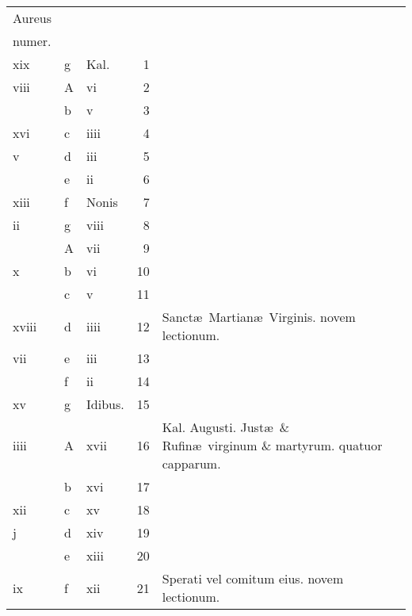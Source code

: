 \documentclass[11pt,openany]{book}
\begin{document}
\begin{center}
\begin{tabular}{l | l | l | r | l r}
\color{Red}Aureus & & & & \color{Red} \\
\color{Red}numer. & & & & \color{Red} \\
\color{Red} xix & g & \color{Red} Kal. & 1 & & \color{Red} \\
\color{Red} viii & \color{Red} A & \color{Red} vi & 2 & & \color{Red} \\
\color{Red}  & b & \color{Red} v & 3 & & \color{Red} \\
\color{Red} xvi & c & \color{Red} iiii & 4 & & \color{Red} \\
\color{Red} v & d & \color{Red} iii & 5 & & \color{Red} \\
\color{Red}  & e & \color{Red} ii & 6 & & \color{Red} \\
\color{Red} xiii & f & Nonis & 7 & & \color{Red} \\
\color{Red} ii & g & \color{Red} viii & 8 & & \color{Red} \\
\color{Red}  & \color{Red} A & \color{Red} vii & 9 & & \color{Red} \\
\color{Red} x & b & \color{Red} vi & 10 & & \color{Red} \\
\color{Red}  & c & \color{Red} v & 11 & & \color{Red} \\
\color{Red} xviii & d & \color{Red} iiii & 12 & Sanct\ae \ Martian\ae \ Virginis. \color{Red} novem lectionum. & \color{Red} \\
\color{Red} vii & e & \color{Red} iii & 13 & & \color{Red} \\
\color{Red}  & f & \color{Red} ii & 14 & & \color{Red} \\
\color{Red} xv & g & Idibus. & 15 & & \color{Red} \\
\color{Red} iiii & \color{Red} A & \color{Red} xvii & 16 & \color{Red} Kal. Augusti. \color{black} Just\ae \ \& Rufin\ae \ virginum \& martyrum. \color{Red} quatuor capparum. & \color{Red} \\
\color{Red}  & b & \color{Red} xvi & 17 & & \color{Red} \\
\color{Red} xii & c & \color{Red} xv & 18 & \color{Red} \\
\color{Red} j & d & \color{Red} xiv & 19 & & \color{Red} \\
\color{Red}  & e & \color{Red} xiii & 20 & & \color{Red} \\
\color{Red} ix & f & \color{Red} xii & 21 & Sperati vel comitum eius. \color{Red} novem lectionum. & \color{Red} \\

\end{tabular}
\end{center}
\end{document}
